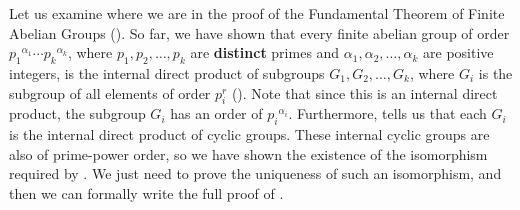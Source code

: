 Let us examine where we are in the proof of the Fundamental Theorem of Finite Abelian Groups (). So far, we have shown that every finite abelian group of order ${p_1}^{\alpha_1}\cdots{p_k}^{\alpha_k}$, where $p_1, p_2, \dots, p_k$ are \textbf{distinct} primes and $\alpha_1, \alpha_2, \dots, \alpha_k$ are positive integers, is the internal direct product of subgroups $G_1, G_2, \dots, G_k$, where $G_i$ is the subgroup of all elements of order $p_i^r$ (). Note that since this is an internal direct product, the subgroup $G_i$ has an order of ${p_i}^{\alpha_i}$. Furthermore,  tells us that each $G_i$ is the internal direct product of cyclic groups. These internal cyclic groups are also of prime-power order, so we have shown the existence of the isomorphism required by . We just need to prove the uniqueness of such an isomorphism, and then we can formally write the full proof of .

